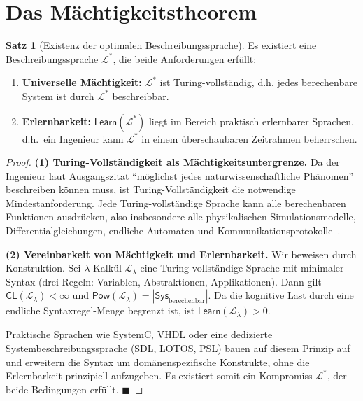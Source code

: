 ﻿\documentclass[a4paper,12pt]{report}
\theoremstyle{definition}
\newtheorem{satz}{Satz}[section]
\begin{document}
\section{Das Mächtigkeitstheorem}
\label{sec:maechtigkeitstheorem}

\begin{satz}[Existenz der optimalen Beschreibungssprache]
\label{satz:optsprache}
Es existiert eine Beschreibungssprache $\mathcal{L}^*$, die beide Anforderungen erfüllt:
\begin{enumerate}
  \item \textbf{Universelle Mächtigkeit:} $\mathcal{L}^*$ ist Turing-vollständig, d.h.
        jedes berechenbare System ist durch $\mathcal{L}^*$ beschreibbar.
  \item \textbf{Erlernbarkeit:} $\mathsf{Learn}(\mathcal{L}^*)$ liegt im Bereich
        praktisch erlernbarer Sprachen, d.h.\ ein Ingenieur kann $\mathcal{L}^*$ in
        einem überschaubaren Zeitrahmen beherrschen.
\end{enumerate}
\end{satz}

\begin{proof}
\textbf{(1) Turing-Vollständigkeit als Mächtigkeitsuntergrenze.}
Da der Ingenieur laut Ausgangszitat \enquote{möglichst jedes naturwissenschaftliche Phänomen}
beschreiben können muss, ist Turing-Vollständigkeit die notwendige Mindestanforderung.
Jede Turing-vollständige Sprache kann alle berechenbaren Funktionen ausdrücken, also
insbesondere alle physikalischen Simulationsmodelle, Differentialgleichungen,
endliche Automaten und Kommunikationsprotokolle~\cite{turing1936}.

\textbf{(2) Vereinbarkeit von Mächtigkeit und Erlernbarkeit.}
Wir beweisen durch Konstruktion.
Sei $\lambda$-Kalkül $\mathcal{L}_\lambda$ eine Turing-vollständige Sprache mit
minimaler Syntax (drei Regeln: Variablen, Abstraktionen, Applikationen).
Dann gilt $\mathsf{CL}(\mathcal{L}_\lambda) < \infty$ und
$\mathsf{Pow}(\mathcal{L}_\lambda) = |\mathsf{Sys}_{\text{berechenbar}}|$.
Da die kognitive Last durch eine endliche Syntaxregel-Menge begrenzt ist, ist
$\mathsf{Learn}(\mathcal{L}_\lambda) > 0$.

Praktische Sprachen wie SystemC, VHDL oder eine dedizierte
Systembeschreibungssprache (SDL, LOTOS, PSL) bauen auf diesem Prinzip auf und
erweitern die Syntax um domänenspezifische Konstrukte, ohne die Erlernbarkeit
prinzipiell aufzugeben. Es existiert somit ein Kompromiss $\mathcal{L}^*$, der beide
Bedingungen erfüllt. $\blacksquare$
\end{proof}
\end{document}
